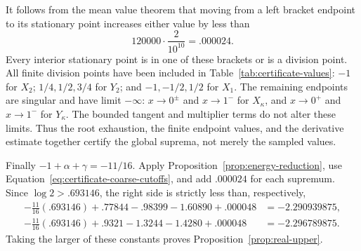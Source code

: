 It follows from the mean value theorem that moving from a left bracket
endpoint to its stationary point increases either value by less than
\[
 120000\cdot\frac2{10^{10}}=.000024.
\]
Every interior stationary point is in one of these brackets or is a
division point.  All finite division points have been included in
Table~\ref{tab:certificate-values}: $-1$ for $X_2$;
$1/4,1/2,3/4$ for $Y_2$; and $-1,-1/2,1/2$ for $X_1$.
The remaining endpoints are singular and have limit $-\infty$:
$x\to0^\pm$ and $x\to1^-$ for $X_\kappa$, and $x\to0^+$ and
$x\to1^-$ for $Y_\kappa$.  The bounded tangent and multiplier terms do
not alter these limits.  Thus the root exhaustion, the finite endpoint
values, and the derivative estimate together certify the global suprema,
not merely the sampled values.

Finally $-1+\alpha+\gamma=-11/16$.  Apply
Proposition~\ref{prop:energy-reduction}, use
Equation~\eqref{eq:certificate-coarse-cutoffs}, and add $.000024$ for
each supremum.  Since $\log2>.693146$, the right side is strictly less
than, respectively,
\begin{align*}
 -\frac{11}{16}(.693146)+.77844-.98399-1.60890+.000048
    &=-2.290939875,\\
 -\frac{11}{16}(.693146)+.9321-1.3244-1.4280+.000048
    &=-2.296789875.
\end{align*}
Taking the larger of these constants proves
Proposition~\ref{prop:real-upper}.
